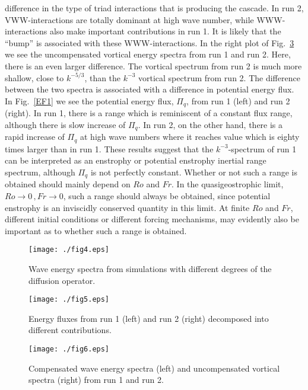 {difference in the type of triad interactions that is producing the cascade. In run 2,
VWW-interactions are totally dominant at high wave number, while WWW-interactions also
make important contributions in run 1. It is likely that the ``bump'' is associated with
these WWW-interactions. In the right plot of Fig.~\ref{C2} we see the uncompensated
vortical energy spectra from run 1 and run 2. Here, there is an even larger difference.
The vortical spectrum from run 2 is much more shallow, close to $ k^{-5/3} $,  than the
$ k^{-3} $ vortical spectrum from run 2. The difference between the two spectra is
associated with a difference in potential energy flux. In Fig.~\ref{EF1} we see the
potential energy flux, $ \Pi_q $,  from run 1 (left) and run 2 (right). In run 1,  there
is a range  which is reminiscent of a constant flux range, although there is slow
increase of  $ \Pi_q $. In run 2, on the other hand, there is a rapid increase of $
\Pi_q $ at high wave numbers where it reaches value which is eighty times larger than in
run 1. These results suggest that the $ k^{-3} $-spectrum of run 1 can be interpreted as
an enstrophy or potential enstrophy inertial range spectrum, although $ \Pi_q $ is not
perfectly constant. Whether or not such a range is obtained should mainly depend on $ Ro
$ and $ Fr $. In the quasigeostrophic limit, $ Ro \rightarrow 0 \, , Fr \rightarrow 0 $,
such a range should always be obtained, since potential enstrophy is an inviscidly
conserved quantity in this limit. At finite $ Ro $ and $ Fr $, different initial
conditions or different forcing mechanisms, may evidently also be important as to
whether such a range is obtained.}

\begin{figure}[h]
\centerline{\texttt{[image: ./fig4.eps]}}
 \caption{Wave energy spectra from simulations with different degrees of the diffusion operator.  }
 \label{Comp1}
 \end{figure}

 \begin{figure}[h]
\centerline{\texttt{[image: ./fig5.eps]}}
 \caption{Energy fluxes from run 1 (left) and run 2 (right) decomposed into different contributions. }
 \label{Flux2}
 \end{figure}

  \begin{figure}[h]
\centerline{\texttt{[image: ./fig6.eps]}}
 \caption{Compensated wave energy spectra (left) and uncompensated vortical spectra (right) from run 1 and run 2. }
 \label{C2}
 \end{figure}



